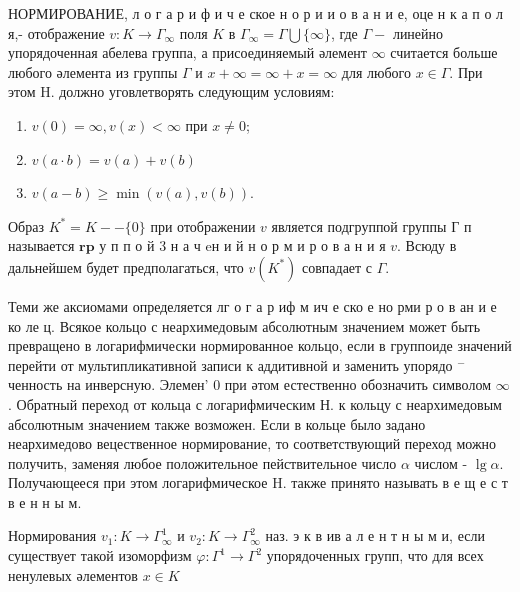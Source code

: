 \documentclass[10pt]{article}
\begin{document}
НОРМИРОВАНИЕ, л о г а р и ф и ч е ское н о р и и о в а н и е, оце н к а п о л я,- отображение $v: K \rightarrow \Gamma_{\infty}$ поля $K$ в $\Gamma_{\infty}=\Gamma \bigcup\{\infty\}$, где $\Gamma-$ линейно упорядоченная абелева группа, а присоединяемый әлемент $\infty$ считается больше любого әлемента из группы $\Gamma$ и $x+\infty=\infty+x=\infty$ для любого $x \in \Gamma$. При этом H. должно уговлетворять следующим условиям:



\begin{enumerate}

  \item $v(0)=\infty, v(x)<\infty$ при $x \neq 0$;



  \item $v(a \cdot b)=v(a)+v(b)$



  \item $v(a-b) \geqslant \min (v(a), v(b))$.



\end{enumerate}



Образ $K^{*}=K--\{0\}$ при отображении $v$ является подгруппой группы Г п называется $\mathbf{r} \mathbf{p}$ у п п о й 3 н а ч eн и й н о р м и р о в а н и я $v$. Всюду в дальнейшем будет предполагаться, что $v\left(K^{*}\right)$ совпадает с $\Gamma$.



Теми же аксиомами определяется лг о г а р иф м ич е ско е но рми р о в ан и е ко ле ц. Всякое кольцо с неархимедовым абсолютным значением может быть превращено в логарифмически нормированное кольцо, если в группоиде значений перейти от мультипликативной записи к аддитивной и заменить упорядо ${ }^{-}$ ченность на инверсную. Элемен' 0 при әтом естественно обозначить символом $\infty$. Обратный переход от кольца с логарифмическим Н. к кольцу с неархимедовым абсолютным значением также возможен. Если в кольце было задано неархимедово вецественное нормирование, то соответствующий переход можно получить, заменяя любое положительное пействительное число $\alpha$ числом - $\lg \alpha$. Получающееся при этом логарифмическое $\mathrm{H}$. также принято называть в е щ е с т в е н н ы м.



Нормирования $v_{1}: K \rightarrow \Gamma_{\infty}^{1}$ и $v_{2}: K \rightarrow \Gamma_{\infty}^{2}$ наз. э к в ив а л е н т н ы м и, если существует такой изоморфизм $\varphi: \Gamma^{1} \rightarrow \Gamma^{2}$ упорядоченных групп, что для всех ненулевых әлементов $x \in K$
\end{document}
